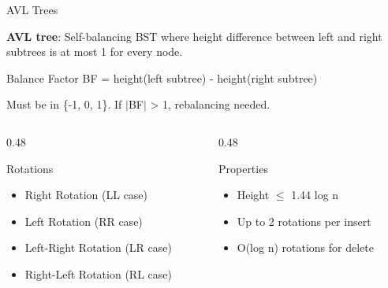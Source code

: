 \documentclass[aspectratio=169,xcolor=dvipsnames]{beamer}
\begin{document}
\begin{frame}{AVL Trees}
  \begin{definition}
    \textbf{AVL tree}: Self-balancing BST where height difference between left and right subtrees is at most 1 for every node.
  \end{definition}

  \begin{block}{Balance Factor}
    BF = height(left subtree) - height(right subtree)

    Must be in \{-1, 0, 1\}. If $|$BF$|$ > 1, rebalancing needed.
  \end{block}

  \vspace{0.3cm}

  \begin{columns}
    \begin{column}{0.48\textwidth}
      \begin{exampleblock}{Rotations}
        \begin{itemize}
          \item Right Rotation (LL case)
          \item Left Rotation (RR case)
          \item Left-Right Rotation (LR case)
          \item Right-Left Rotation (RL case)
        \end{itemize}
      \end{exampleblock}
    \end{column}
    \begin{column}{0.48\textwidth}
      \begin{alertblock}{Properties}
        \begin{itemize}
          \item Height $\leq$ 1.44 log n
          \item Up to 2 rotations per insert
          \item O(log n) rotations for delete
        \end{itemize}
      \end{alertblock}
    \end{column}
  \end{columns}
\end{frame}
\end{document}
